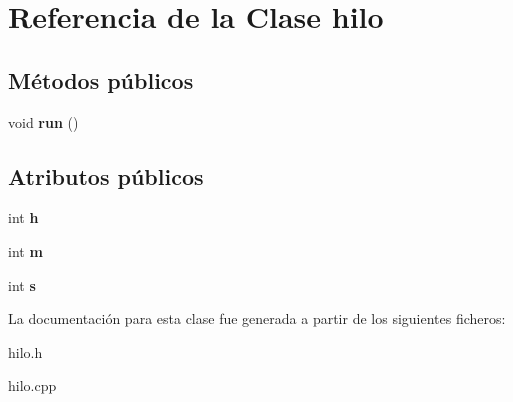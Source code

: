\hypertarget{classhilo}{\section{Referencia de la Clase hilo}
\label{classhilo}
}
\subsection*{Métodos públicos}
\begin{DoxyCompactItemize}
\item 
\hypertarget{classhilo_a3c85d22668484f7ad3465e36e256335c}{void {\bfseries run} ()}\label{classhilo_a3c85d22668484f7ad3465e36e256335c}

\end{DoxyCompactItemize}
\subsection*{Atributos públicos}
\begin{DoxyCompactItemize}
\item 
\hypertarget{classhilo_a11207db6bdbbb14bf2e41531ae5c97c6}{int {\bfseries h}}\label{classhilo_a11207db6bdbbb14bf2e41531ae5c97c6}

\item 
\hypertarget{classhilo_a855491fa6ad31434fe6434ed203efa70}{int {\bfseries m}}\label{classhilo_a855491fa6ad31434fe6434ed203efa70}

\item 
\hypertarget{classhilo_a1e1fc39fd350767cdfceafa341445b8b}{int {\bfseries s}}\label{classhilo_a1e1fc39fd350767cdfceafa341445b8b}

\end{DoxyCompactItemize}


La documentación para esta clase fue generada a partir de los siguientes ficheros\-:\begin{DoxyCompactItemize}
\item 
hilo.\-h\item 
hilo.\-cpp\end{DoxyCompactItemize}

